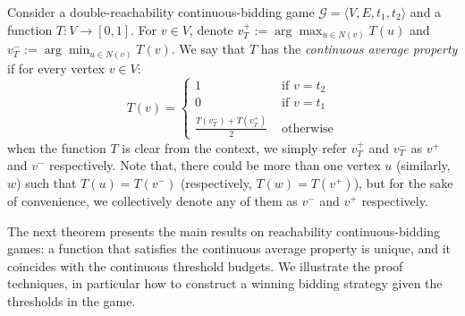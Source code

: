 \documentclass{article}\providecommand{\nequiv}{\not\equiv}\usepackage[a4paper,margin=20mm]{geometry}
\newcommand{\G}{{\mathcal G}}
\newcommand{\zug}[1]{\langle #1  \rangle}
\begin{document}
\begin{definition}
\label{def:continuous-average}
Consider a double-reachability continuous-bidding game $\G = \zug{V, E, t_1, t_2}$ and a function $T: V \rightarrow [0,1]$. For $v \in V$, denote $v^+_T := \arg\max_{u \in N(v)} T(u)$ and $v^-_T := \arg\min_{u \in N(v)} T(v)$. We say that $T$ has the {\em continuous average property} if for every vertex $v \in V$: 
\[T(v) = \begin{cases}
1 & \text{ if } v = t_2 \\
0 & \text{ if } v = t_1 \\
\frac{T(v^-_T) + T(v^+_T)}{2} & \text{ otherwise}
\end{cases}
\]
when the function \(T\) is clear from the context, we simply refer \(v^+_T\) and \(v^-_T\) as \(v^+\) and \(v^-\) respectively. 
Note that, there could be more than one vertex \(u\) (similarly, \(w\)) such that \(T(u) = T(v^-)\) (respectively, \(T(w) = T(v^+)\)), but for the sake of convenience, we collectively denote any of them as \(v^-\) and \(v^+\) respectively. 
\end{definition}

The next theorem presents the main results on reachability continuous-bidding games: a function that satisfies the continuous average property is unique, and it coincides with the continuous threshold budgets. We illustrate the proof techniques, in particular how to construct a winning bidding strategy given the thresholds in the game.
\end{document}
